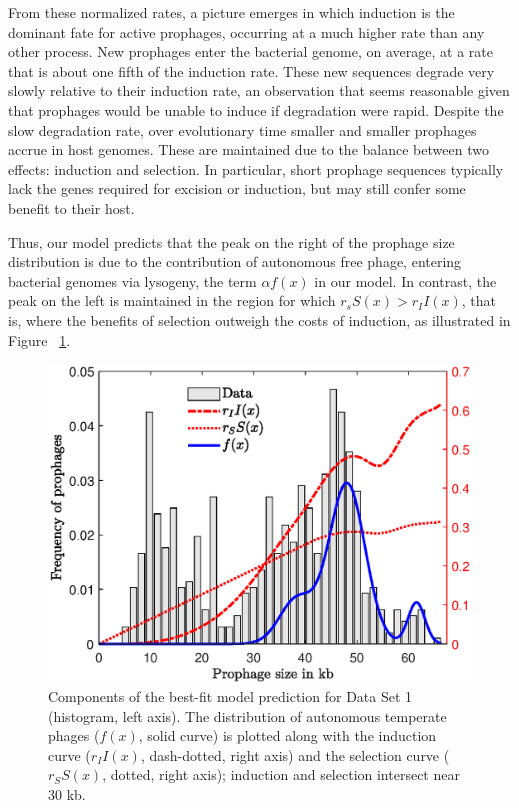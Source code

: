 

From these normalized rates, a picture emerges in which induction is the dominant fate for active prophages, occurring at a much higher rate than any other process.  New prophages enter the bacterial genome, on average, at a rate that is about one fifth of the induction rate.  These new sequences degrade very slowly relative to their induction rate, an observation that seems reasonable given that prophages would be unable to induce if degradation were rapid.   Despite the slow degradation rate, over evolutionary time smaller and smaller prophages accrue in host genomes.  These are maintained due to the balance between two effects: induction and selection.  In particular, short prophage sequences typically lack the genes required for excision or induction, but may still confer some benefit to their host.

Thus, our model predicts that the peak on the right of the prophage size distribution is due to the contribution of autonomous free phage, entering bacterial genomes via lysogeny, the term $\alpha f(x)$ in our model.  In contrast, the peak on the left is maintained in the region for which $r_s S(x) > r_I I(x)$, that is, where the benefits of selection outweigh the costs of induction, as illustrated in Figure ~\ref{fig:combine}.

\begin{figure}[H]
\centering
\includegraphics[scale=0.65]{combined1}
\caption[Components of the best-fit model prediction for Data Set 1.]{Components of the best-fit model prediction for Data Set 1 (histogram, left axis).  The distribution of autonomous temperate phages ($f(x)$, solid curve) is plotted along with the induction curve ($r_I I(x)$, dash-dotted, right axis) and the selection curve ($r_{S}S(x)$, dotted, right axis); induction and selection intersect near 30 kb.}
\label{fig:combine}
\end{figure}


